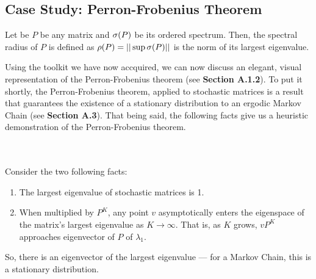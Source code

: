 

\newpage
\subsection{Case Study: Perron-Frobenius Theorem}

\begin{definition}
  Let be $P$ be any matrix and $\sigma(P)$ be its ordered spectrum. Then, the spectral radius of $P$ is defined as $\rho(P) = ||\sup \sigma(P)||$ is the norm of its largest eigenvalue.
\end{definition}


Using the toolkit we have now accquired, we can now discuss an elegant, visual representation of the Perron-Frobenius theorem (see \textbf{Section A.1.2}).
To put it shortly, the Perron-Frobenius theorem, applied to stochastic matrices is a result that guarantees the existence of a stationary distribution to an ergodic Markov Chain (see \textbf{Section A.3}).
That being said, the following facts give us a heuristic demonstration of the Perron-Frobenius theorem.

\begin{theorem} \hfill
  \vspace{-1em}
  \\ \\ Consider the two following facts:
  \begin{enumerate}
    \item The largest eigenvalue of stochastic matrices is 1.
    \item When multiplied by $P^K$, any point $v$ asymptotically enters the eigenspace of the matrix's largest eigenvalue as $K \to \infty$. That is, as $K$ grows, $v P^K$ approaches eigenvector of $P$ of $\lambda_1$.
  \end{enumerate}
So, there is an eigenvector of the largest eigenvalue --- for a Markov Chain, this is a stationary distribution.
\end{theorem}


